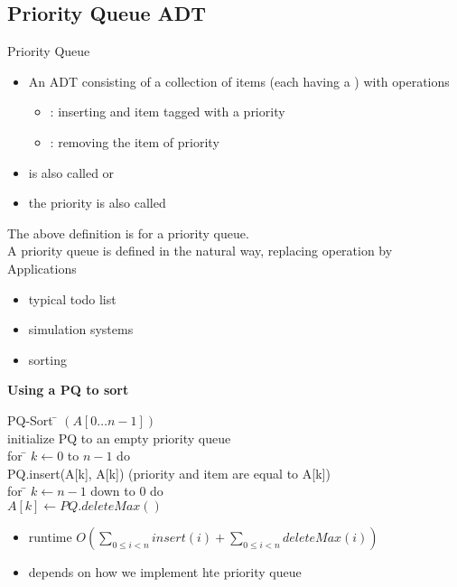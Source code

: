 \documentclass[letterpaper, 12pt]{article}
\newcommand{\red}[1]{{\color{red}{#1}}}
\begin{document}
    \subsection{Priority Queue ADT}
    Priority Queue
    \begin{itemize}
        \item An ADT consisting of a collection of items (each having a \red{priority}) with operations
        \begin{itemize}
            \item \red{insert}: inserting and item tagged with a priority
            \item \red{deleteMax}: removing the item of \red{highest} priority
        \end{itemize}
        \item \red{deleteMax} is also called \red{extractMax} or \red{getMax}
        \item the priority is also called \red{key}
    \end{itemize}
    The above definition is for a \red{maximum-oriented} priority queue.\\
    A \red{minimum-oriented} priority queue is defined in the natural way, replacing operation \red{deleteMax} by \red{deleteMin}\\
    \bigskip
    Applications
    \begin{itemize}
        \item typical todo list
        \item simulation systems
        \item sorting
    \end{itemize}
    \pagebreak
    
    \textbf{Using a PQ to sort}\\
    \begin{tabbing}
        PQ-Sort \= \+ $(A[0 \dots n-1])$\\
            initialize PQ to an empty priority queue\\
            for \= $k \leftarrow 0$ to $n-1$ do\\
                \> PQ.insert(A[k], A[k]) \hspace{1cm} (priority and item are equal to A[k])\\
            for \= $k \leftarrow n-1$ down to $0$ do\\
                \> $A[k] \leftarrow PQ.deleteMax()$\\
    \end{tabbing}
    \begin{itemize}
        \item runtime $O(\sum_{0\leq i < n}insert(i) + \sum_{0 \leq i < n}deleteMax(i))$
        \item depends on how we implement hte priority queue
    \end{itemize}
    \bigskip
\end{document}
